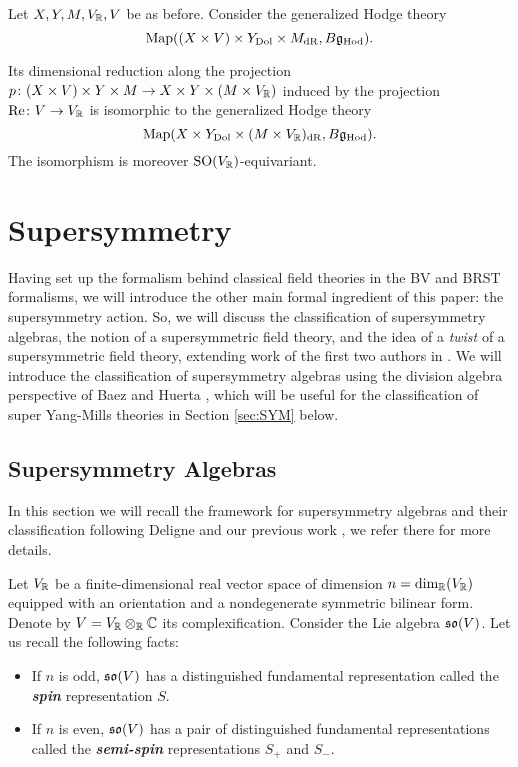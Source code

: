 \documentclass[10pt, oneside]{article}
\newcommand{\Hod}{\mathrm{Hod}}
\renewcommand{\Re}{\mathrm{Re}}
\newcommand{\defterm}[1]{\textbf{\emph{#1}}}
\begin{document}
\begin{cor}
Let $X, Y, M, V_\mathbb R, V$ be as before. Consider the generalized Hodge theory
\[\map((X\times V)\times Y_{\mr{Dol}}\times M_{\mr{dR}}, B\fg_\Hod).\]

Its dimensional reduction along the projection $p\colon (X\times V)\times Y\times M\rightarrow X\times Y\times (M\times V_\mathbb R)$ induced by the projection $\Re\colon V\rightarrow V_\RR$ is isomorphic to the generalized Hodge theory
\[\map(X\times Y_{\mr{Dol}}\times (M\times V_\RR)_{\mr{dR}}, B\fg_\Hod).\]
The isomorphism is moreover $\mathrm{SO}(V_\mathbb R)$-equivariant.
\label{cor:Hodgeholomorphicreduction}
\end{cor}

\section{Supersymmetry} \label{sec: susy}
Having set up the formalism behind classical field theories in the BV and BRST formalisms, we will introduce the other main formal ingredient of this paper: the supersymmetry action.  So, we will discuss the classification of supersymmetry algebras, the notion of a supersymmetric field theory, and the idea of a \emph{twist} of a supersymmetric field theory, extending work of the first two authors in \cite{ElliottSafronov}.  We will introduce the classification of supersymmetry algebras using the division algebra perspective of Baez and Huerta \cite{BaezHuerta}, which will be useful for the classification of super Yang-Mills theories in Section \ref{sec:SYM} below.

\subsection{Supersymmetry Algebras} \label{sec:susyalgebras}
In this section we will recall the framework for supersymmetry algebras and their classification following Deligne \cite{DeligneSpinors} and our previous work \cite{ElliottSafronov}, we refer there for more details.

Let $V_\mathbb R$ be a finite-dimensional real vector space of dimension $n=\dim_\mathbb R(V_\mathbb R)$ equipped with an orientation and a nondegenerate symmetric bilinear form. Denote by $V=V_\mathbb R\otimes_\mathbb R\mathbb C$ its complexification. Consider the Lie algebra $\mathfrak{so}(V)$. Let us recall the following facts:
\begin{itemize}
\item If $n$ is odd, $\mathfrak{so}(V)$ has a distinguished fundamental representation called the \defterm{spin} representation $S$.

\item If $n$ is even, $\mathfrak{so}(V)$ has a pair of distinguished fundamental representations called the \defterm{semi-spin} representations $S_+$ and $S_-$.
\end{itemize}
\end{document}

